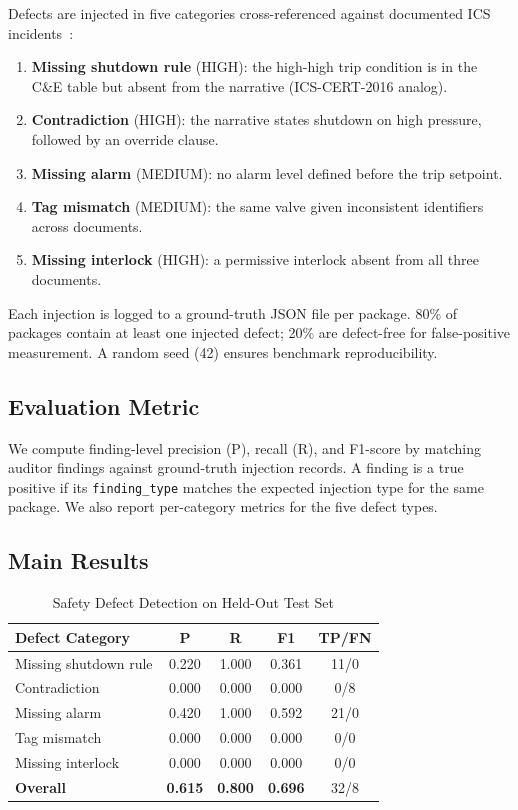 \documentclass[conference]{IEEEtran}
\begin{document}
Defects are injected in five categories cross-referenced against documented
ICS incidents~\cite{icscert2016,ntsb2016,csb2005}:
\begin{enumerate}
\item \textbf{Missing shutdown rule} (HIGH): the high-high trip condition
  is in the C\&E table but absent from the narrative (ICS-CERT-2016 analog).
\item \textbf{Contradiction} (HIGH): the narrative states shutdown on high
  pressure, followed by an override clause.
\item \textbf{Missing alarm} (MEDIUM): no alarm level defined before the
  trip setpoint.
\item \textbf{Tag mismatch} (MEDIUM): the same valve given inconsistent
  identifiers across documents.
\item \textbf{Missing interlock} (HIGH): a permissive interlock absent from
  all three documents.
\end{enumerate}
Each injection is logged to a ground-truth JSON file per package. 80\% of
packages contain at least one injected defect; 20\% are defect-free for
false-positive measurement. A random seed (42) ensures benchmark
reproducibility.

\subsection{Evaluation Metric}
We compute finding-level precision (P), recall (R), and F1-score by
matching auditor findings against ground-truth injection records.
A finding is a true positive if its \texttt{finding\_type} matches the
expected injection type for the same package. We also report per-category
metrics for the five defect types.

\subsection{Main Results}

\begin{table}[t]
\caption{Safety Defect Detection on Held-Out Test Set}
\label{tab:results}
\centering
\small
\begin{tabular}{@{}lcccc@{}}
\toprule
\textbf{Defect Category} & \textbf{P} & \textbf{R} & \textbf{F1} & \textbf{TP/FN} \\
\midrule
Missing shutdown rule  & 0.220 & 1.000 & 0.361 & 11/0 \\
Contradiction          & 0.000 & 0.000 & 0.000 & 0/8 \\
Missing alarm          & 0.420 & 1.000 & 0.592 & 21/0 \\
Tag mismatch           & 0.000 & 0.000 & 0.000 & 0/0 \\
Missing interlock      & 0.000 & 0.000 & 0.000 & 0/0 \\
\midrule
\textbf{Overall}       & \textbf{0.615} & \textbf{0.800} & \textbf{0.696} & 32/8 \\
\bottomrule
\end{tabular}
\end{table}
\end{document}
